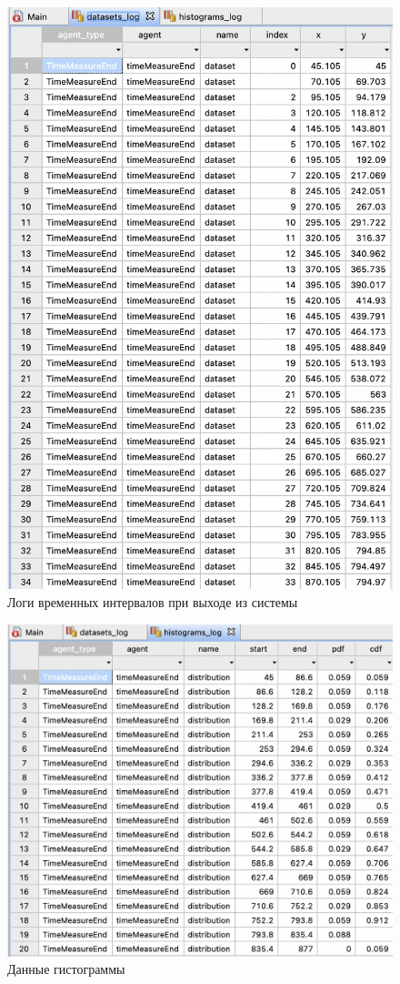 \documentclass[14pt, a4paper, titlepage]{extarticle}
\begin{document}
	\begin{figure}[H]
		\includegraphics[width=.9\textwidth]{datasets_log}
		\caption{Логи временных интервалов при выходе из системы}
	\end{figure}

	\begin{figure}[H]
		\includegraphics[width=.9\textwidth]{histograms_log}
		\caption{Данные гистограммы}
	\end{figure}
	
\end{document}
